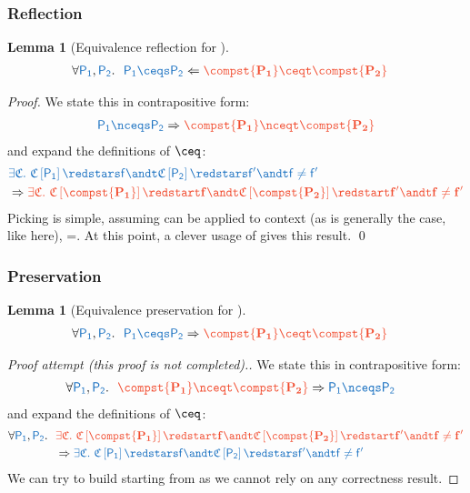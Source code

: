 \documentclass{article}
\newtheorem{lemma}[theorem]{Lemma}
\theoremstyle{definition}
\begin{document}
\subsubsection{Reflection}
\begin{lemma}[Equivalence reflection for \compst{\cdot}]\label{thm:refl-compgen}
	\begin{align*}
		\forall \src{P_1}, \src{P_2}.~
			&\
			\src{P_1\ceqs P_2} \Leftarrow \trg{\compst{P_1}\ceqt \compst{P_2}}
	\end{align*}
\end{lemma}
\begin{proof}
We state this in contrapositive form:
\begin{align*}
	\src{P_1\nceqs P_2}\Rightarrow \trg{\compst{P_1}\nceqt \compst{P_2}}
\end{align*}
and expand the definitions of $\ceq$:
\begin{align*}
	&
	\src{\exists \ctx.~ \ctx\hole{P_1}\redstars f \andt \ctx\hole{P_2}\redstars f' \andt f\neq f'} 
	\\
	&
	\Rightarrow \trg{\exists \ctx.~ \ctx\hole{\compst{P_1}} \redstart f \andt \ctx\hole{\compst{P_2}}\redstart f'  \andt f\neq f'}
\end{align*}
Picking \trg{\ctx} is simple, assuming \compst{\cdot} can be applied to context (as is generally the case, like here), \trg{\ctx}=\compst{\src{\ctx}}.
At this point, a clever usage of \Thmref{thm:fow-sim} gives this result.
\qed
\end{proof}


\subsubsection{Preservation}
\begin{lemma}[Equivalence preservation for \compst{\cdot}]\label{thm:pres-compgen}
	\begin{align*}
	\forall \src{P_1}, \src{P_2}.~
		&\
		\src{P_1\ceqs P_2} \Rightarrow \trg{\compst{P_1}\ceqt \compst{P_2}}
\end{align*}

\end{lemma}
\begin{proof}[Proof attempt (this proof is not completed).]
We state this in contrapositive form:
\begin{align*}
	\forall \src{P_1}, \src{P_2}.~
		&\
		\trg{\compst{P_1}\nceqt \compst{P_2}} \Rightarrow \src{P_1\nceqs P_2}
\end{align*}
and expand the definitions of $\ceq$:
\begin{align*}
	\forall \src{P_1}, \src{P_2}.~
		&\
		\trg{\exists \ctx.~ \ctx\hole{\compst{P_1}} \redstart f \andt \ctx\hole{\compst{P_2}}\redstart f' \andt f\neq f' } 
		\\
		&\ 
		\Rightarrow \src{\exists \ctx.~ \ctx\hole{P_1}\redstars f \andt \ctx\hole{P_2}\redstars f' \andt f\neq f'}
\end{align*}
We can try to build \src{\ctx} starting from \trg{\ctx} as we cannot rely on any correctness result.
\end{proof}
\end{document}
